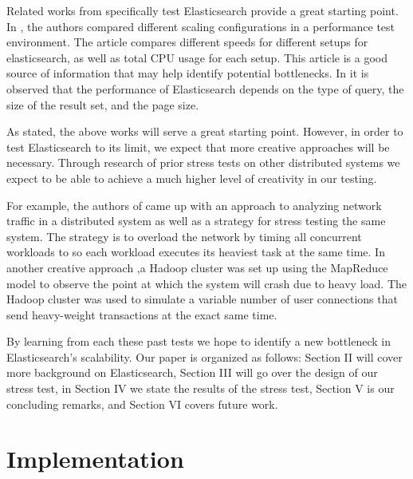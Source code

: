 \documentclass[journal]{IEEEtran}
\begin{document}
Related works from \cite{berger_2018,thacker_pandey_rautaray_2016} specifically test Elasticsearch provide a great starting point. In \cite{berger_2018}, the authors compared different scaling configurations in a performance test environment. The article compares different speeds for different setups for elasticsearch, as well as total CPU usage for each setup. This article is a good source of information that may help identify potential bottlenecks. In \cite{thacker_pandey_rautaray_2016} it is observed that the performance of Elasticsearch depends on the type of query, the size of the result set, and the page size.

As stated, the above works will serve a great starting point. However, in order to test Elasticsearch to its limit, we expect that more creative approaches will be necessary. Through research of prior stress tests on other distributed systems we expect to be able to achieve a much higher level of creativity in our testing.

For example, the authors of \cite{garousi_briand_labiche_2006} came up with an approach to analyzing network traffic in a distributed system as well as a strategy for stress testing the same system. The strategy is to overload the network by timing all concurrent workloads to so each workload executes its heaviest task at the same time. In another creative approach \cite{hwang_wu-lee_tung_chuang_wu_2014},a Hadoop cluster was set up using the MapReduce model to observe the point at which the system will crash due to heavy load. The Hadoop cluster was used to simulate a variable number of user connections that send heavy-weight transactions at the exact same time. 

By learning from each these past tests we hope to identify a new bottleneck in Elasticsearch's scalability. Our paper is organized as follows: Section II will cover more background on Elasticsearch, Section III will go over the design of our stress test, in Section IV we state the results of the stress test, Section V is our concluding remarks, and Section VI covers future work.

\section{Implementation}
\end{document}
